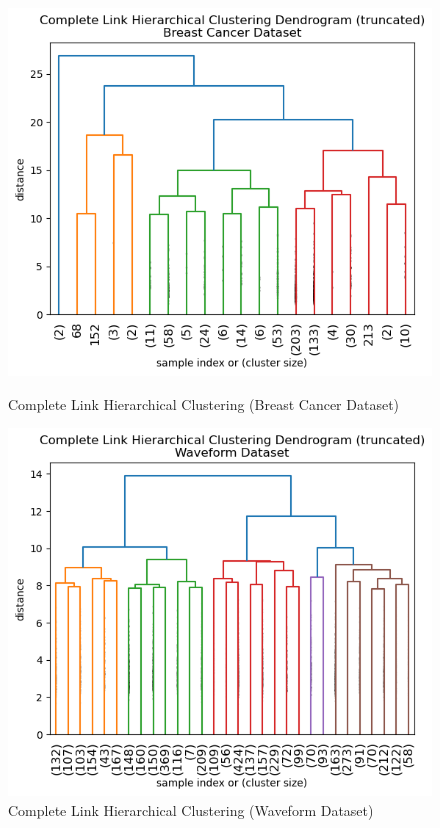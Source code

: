 \documentclass{article}
\begin{document}
\begin{figure}[H]
    \centering
    \begin{minipage}[b]{0.49\textwidth}
        \centering
        \includegraphics[width=\textwidth, height=0.3\textheight]{complete_cancer_dend.png}
        \caption{Complete Link Hierarchical Clustering (Breast Cancer Dataset)}
    \end{minipage}
    \hfill
    \begin{minipage}[b]{0.49\textwidth}
        \centering
        \includegraphics[width=\textwidth, height=0.3\textheight]{complete_waveform_dend.png}
        \caption{Complete Link Hierarchical Clustering (Waveform Dataset)}
    \end{minipage}
\end{figure}
\end{document}
